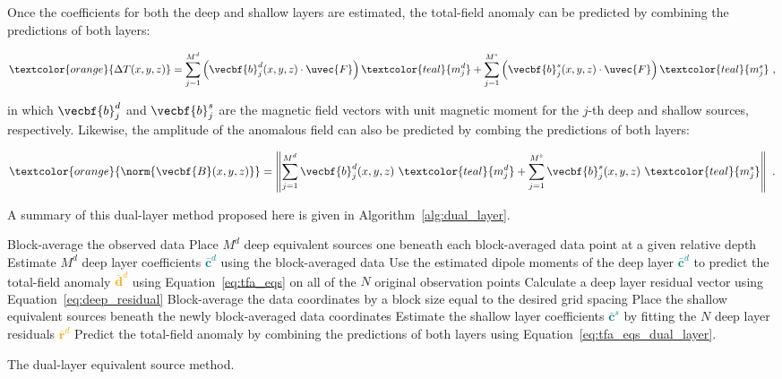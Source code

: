 Once the coefficients for both the deep and shallow layers are estimated, the total-field anomaly can be predicted by combining the predictions of both layers:

\begin{equation}
    \label{eq:tfa_eqs_dual_layer}
    \textcolor{orange}{\Delta T (x, y, z)} = 
    \sum_{j=1}^{M^d} \left(
        \vecbf{b}^d_j(x, y, z) \cdot \uvec{F}
    \right) \textcolor{teal}{m_j^d}
    + \sum_{j=1}^{M^s} \left(
        \vecbf{b}^s_j(x, y, z) \cdot \uvec{F}
    \right) \textcolor{teal}{m_j^s}
  \ ,
\end{equation}

\noindent
in which $\vecbf{b}_j^d$ and $\vecbf{b}_j^s$ are the magnetic field vectors with unit magnetic moment for the $j$-th deep and shallow sources, respectively. Likewise, the amplitude of the anomalous field can also be predicted by combing the predictions of both layers:

\begin{equation}
  \textcolor{orange}{\norm{\vecbf{B}(x,y,z)}} =
  \left\lVert \sum_{j=1}^{M^d} \vecbf{b}^d_{j}(x,y,z)\ \textcolor{teal}{m^d_j}
  +
  \sum_{j=1}^{M^s}  \vecbf{b}^s_{j}(x,y,z)\ \textcolor{teal}{m^s_j}
  \right\rVert
  \ .
\end{equation}

\noindent
A summary of this dual-layer method proposed here is given in Algorithm~\ref{alg:dual_layer}.

\begin{algorithm}[!htb]
  Block-average the observed data
  \;
  Place $M^d$ deep equivalent sources one beneath each block-averaged data point at a given relative depth
  \;
  Estimate $M^d$ deep layer coefficients \textcolor{teal}{$\bar{\mathbf{c}}^d$} using the block-averaged data
  \;
  Use the estimated dipole moments of the deep layer \textcolor{teal}{$\bar{\mathbf{c}}^d$} to predict the total-field anomaly \textcolor{orange}{$\bar{\mathbf{d}}^d$} using Equation~\ref{eq:tfa_eqs} on all of the $N$ original observation points
  \;
  Calculate a deep layer residual vector using Equation~\ref{eq:deep_residual}
  \;
  Block-average the data coordinates by a block size equal to the desired grid spacing
  \;
  Place the shallow equivalent sources beneath the newly block-averaged data coordinates
  \;
  Estimate the shallow layer coefficients \textcolor{teal}{$\bar{\mathbf{c}}^s$} by fitting the $N$ deep layer residuals \textcolor{orange}{$\bar{\mathbf{r}}^d$}
  \;
   Predict the total-field anomaly by combining the predictions of both layers using Equation~\ref{eq:tfa_eqs_dual_layer}.
  \BlankLine
  \caption{The dual-layer equivalent source method.}
  \label{alg:dual_layer}
\end{algorithm}


